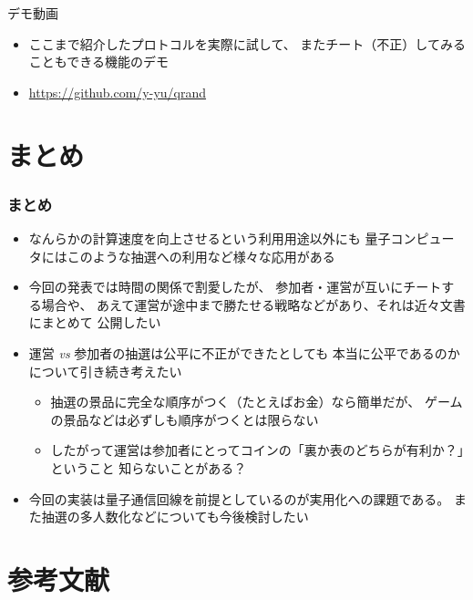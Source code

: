 \begin{frame}
  \centering
  {\Huge デモ動画}

  \begin{itemize}
    \item ここまで紹介したプロトコルを実際に試して、
    またチート（不正）してみることもできる機能のデモ
    
    \item \url{https://github.com/y-yu/qrand}%
  \end{itemize}
\end{frame}

\section{まとめ}

\begin{frame}
  \frametitle{まとめ}

  \pause
  \begin{itemize}
    \item<+-> なんらかの計算速度を向上させるという利用用途以外にも
    量子コンピュータにはこのような抽選への利用など様々な応用がある

    \item<+-> 今回の発表では時間の関係で割愛したが、
    参加者・運営が互いにチートする場合や、
    あえて運営が途中まで勝たせる戦略などがあり、それは近々文書にまとめて
    公開したい

    \item<+-> 運営 \textit{vs} 参加者の抽選は公平に不正ができたとしても
    本当に公平であるのかについて引き続き考えたい
    \begin{itemize}
      \item 抽選の景品に完全な順序がつく（たとえばお金）なら簡単だが、
      ゲームの景品などは必ずしも順序がつくとは限らない
      
      \item したがって運営は参加者にとってコインの「裏か表のどちらが有利か？」ということ
      知らないことがある？
    \end{itemize}
    
    \item<+-> 今回の実装は量子通信回線を前提としているのが実用化への課題である。
    また抽選の多人数化などについても今後検討したい
  \end{itemize}
\end{frame}

\section*{参考文献}

